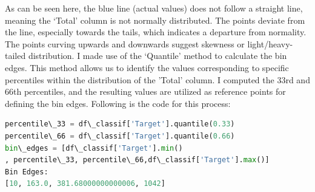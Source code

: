 As can be seen here, the blue line (actual values) does not follow a straight line, meaning the ‘Total’ column is not normally distributed. The points deviate from the line, especially towards the tails, which indicates a departure from normality. The points curving upwards and downwards suggest skewness or light/heavy-tailed distribution.
\newline
\newline
I made use of the ‘Quantile’ method to calculate the bin edges.  This method allows us to identify the values corresponding to specific percentiles within the distribution of the 'Total' column. I computed the 33rd and 66th percentiles, and the resulting values are utilized as reference points for defining the bin edges. Following is the code for this process:

\begin{lstlisting}[language=Python, frame=none]
percentile\_33 = df\_classif['Target'].quantile(0.33) 
percentile\_66 = df\_classif['Target'].quantile(0.66) 
bin\_edges = [df\_classif['Target'].min()
, percentile\_33, percentile\_66,df\_classif['Target'].max()] 
Bin Edges: 
[10, 163.0, 381.68000000000006, 1042]
\end{lstlisting}

